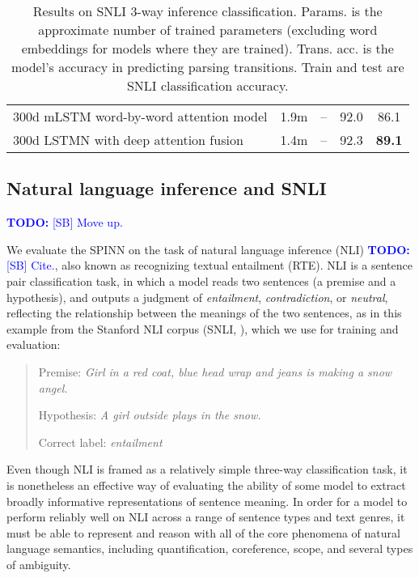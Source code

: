 \documentclass[11pt]{article}
\newcommand\todo[1]{\textcolor{blue}{\textbf{TODO:} #1}}
\begin{document}
\begin{table*}[t]
\begin{tabular}{lcccc}
300d mLSTM word-by-word attention model \citep{DBLP:journals/corr/WangJ15b}
                        & 1.9m               & --             &   92.0   &   86.1      \\
300d LSTMN with deep attention fusion \citep{cheng2016long}
                        & 1.4m               & --                &   92.3   &   \textbf{89.1}      \\
    \bottomrule
  \end{tabular}
\caption{\protect\label{tab:results}Results on SNLI 3-way inference classification. Params. is the approximate number of trained parameters (excluding word embeddings for models where they are trained). Trans. acc. is the model's accuracy in predicting parsing transitions. Train and test are SNLI classification accuracy.} 
\end{table*}


\subsection{Natural language inference and SNLI}
\todo{[SB] Move up.}

We evaluate the SPINN on the task of natural language inference (NLI) \todo{[SB] Cite.}, also known as recognizing textual entailment (RTE). NLI is a sentence pair classification task, in which a model reads two sentences (a premise and a hypothesis), and outputs a judgment of {\it entailment}, {\it contradiction}, or {\it neutral}, reflecting the relationship between the meanings of the two sentences, as in this example from the Stanford NLI corpus (SNLI, \citet{snli:emnlp2015}), which we use for training and evaluation: 

\begin{quote}
Premise: {\it Girl in a red coat, blue head wrap and jeans is making a snow angel.}

Hypothesis: {\it A girl outside plays in the snow.}

Correct label: {\it entailment}
\end{quote}

Even though NLI is framed as a relatively simple three-way classification task, it is nonetheless an effective way of evaluating the ability of some model to extract broadly informative representations of sentence meaning. In order for a model to perform reliably well on NLI across a range of sentence types and text genres, it must be able to represent and reason with all of the core phenomena of natural language semantics, including quantification, coreference, scope, and several types of ambiguity.
\end{document}
